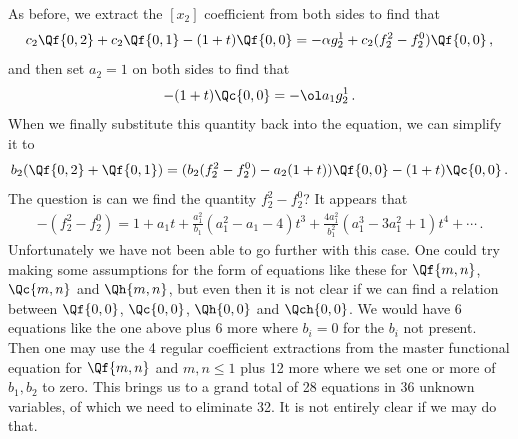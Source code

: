 As before, we extract the $[x_2]$ coefficient from both sides to find that
\begin{align}
	 c_2\Qf{0,2}+c_2\Qf{0,1}-(1+t)\Qf{0,0} = -\alpha g_2^1 + c_2(f_2^2-f_2^0)\Qf{0,0}\,,
\end{align}
and then set $a_2 = 1$ on both sides to find that
\begin{align}
	-(1+t)\Qc{0,0} = -\ol a_1 g_2^1\,.
\end{align}
When we finally substitute this quantity back into the equation, we can simplify it to
\begin{align}
	b_2(\Qf{0,2}+\Qf{0,1}) = (b_2(f_2^2-f_2^0)-a_2(1+t))\Qf{0,0}-(1+t)\Qc{0,0}\,.
\end{align}
The question is can we find the quantity $f_2^2-f_2^0$? It appears that
\begin{align}
	-(f_2^2-f_2^0) =1+a_1t+\frac{a_1^2}{b_1}(a_1^2-a_1-4)t^3 +\frac{4a_1^2}{b_1^2}(a_1^3-3a_1^2+1)t^4+\cdots\,.
\end{align}
Unfortunately we have not been able to go further with this case. One could try making some assumptions for the form of equations like these for $\Qf{m,n}$, $\Qc{m,n}$ and $\Qh{m,n}$, but even then it is not clear if we can find a relation between $\Qf{0,0}$, $\Qc{0,0}$, $\Qh{0,0}$ and $\Qch{0,0}$. We would have 6 equations like the one above plus 6 more where $b_i = 0$ for the $b_i$ not present. Then one may use the 4 regular coefficient extractions from the master functional equation for $\Qf{m,n}$ and $m,n\leq 1$ plus 12 more where we set one or more of $b_1,b_2$ to zero. This brings us to a grand total of 28 equations in 36 unknown variables, of which we need to eliminate 32. It is not entirely clear if we may do that.

\endinput